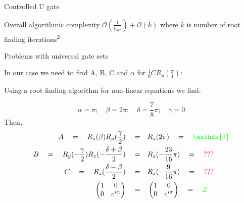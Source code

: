\documentclass[10pt]{beamer}
\begin{document}
{\begin{frame}{Controlled U gate}

	\begin{alertblock}{Overall algorithmic complexity}
	$\mathcal{O}(\frac{1}{p_{acc}})+\mathcal{O}(k)$ where $k$ is number of root finding iterations\textsuperscript{2}
	\end{alertblock}
\end{frame}

}

{
\begin{frame}{Problems with universal gate sets}

In our case we need to find A, B, C and $\alpha$ for $_0^1CR_y(\frac{\pi}{4})$:

Using a root finding algorithm for non-linear equations we find:

\begin{equation}
\alpha =  \pi; \quad 
\beta = 2\pi;\quad 
\delta = \frac{7}{8}\pi;\quad 
\gamma = 0
\end{equation}
Then,
\begin{align}
A \quad= \quad R_z(\beta)R_y(\frac{\gamma}{2})\quad =& \quad R_z(2\pi) \quad = \quad \textcolor{green}{\mathds{1}} \\
B\quad =\quad R_y(-\frac{\gamma}{2})R_z(-\frac{\delta+\beta}{2})\quad =& \quad R_z(-\frac{23}{16}\pi) \quad= \quad \textcolor{red}{???}  \\
C \quad=\quad R_z(\frac{\delta-\beta}{2})\quad =& \quad R_z(-\frac{9}{16}\pi) \quad= \quad \textcolor{red}{???} \\
\begin{pmatrix} 1&0\cr0&e^{i\alpha} \end{pmatrix}\quad=& \quad \begin{pmatrix} 1&0\cr0&e^{i\pi} \end{pmatrix}\quad= \quad \textcolor{green}{Z}
\end{align}

\end{frame}
}
\end{document}
